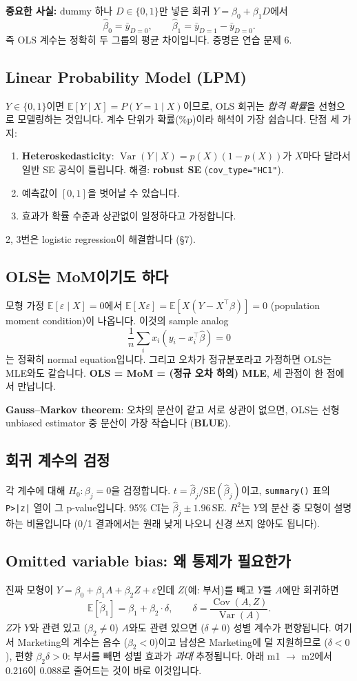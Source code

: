 \documentclass[11pt,a4paper]{article}
\newcommand{\E}{\mathbb{E}}
\newcommand{\Var}{\operatorname{Var}}
\newcommand{\Cov}{\operatorname{Cov}}
\newcommand{\term}[1]{\textbf{#1}}
\newcommand{\code}[1]{\texttt{#1}}
\begin{document}
\textbf{중요한 사실:} dummy 하나 $D\in\{0,1\}$만 넣은 회귀 $Y=\beta_0+\beta_1D$에서
\[
\hat\beta_0=\bar y_{D=0},\qquad \hat\beta_1=\bar y_{D=1}-\bar y_{D=0}.
\]
즉 OLS 계수는 정확히 두 그룹의 평균 차이입니다. 증명은 연습 문제 6.

\subsection{Linear Probability Model (LPM)}
$Y\in\{0,1\}$이면 $\E[Y\mid X]=P(Y=1\mid X)$이므로, OLS 회귀는 \emph{합격 확률}을 선형으로 모델링하는 것입니다. 계수 단위가 확률(\%p)이라 해석이 가장 쉽습니다. 단점 세 가지:
\begin{enumerate}
\item \term{Heteroskedasticity}: $\Var(Y\mid X)=p(X)(1-p(X))$가 $X$마다 달라서 일반 SE 공식이 틀립니다. 해결: \term{robust SE} (\code{cov\_type="HC1"}).
\item 예측값이 $[0,1]$을 벗어날 수 있습니다.
\item 효과가 확률 수준과 상관없이 일정하다고 가정합니다.
\end{enumerate}
2, 3번은 logistic regression이 해결합니다 (\S7).

\subsection{OLS는 MoM이기도 하다}
모형 가정 $\E[\varepsilon\mid X]=0$에서 $\E[X\varepsilon]=\E[X(Y-X^\top\beta)]=0$ (population moment condition)이 나옵니다. 이것의 sample analog
\[
\frac1n\sum_i x_i(y_i-x_i^\top\hat\beta)=0
\]
는 정확히 normal equation입니다. 그리고 오차가 정규분포라고 가정하면 OLS는 MLE와도 같습니다. \textbf{OLS = MoM = (정규 오차 하의) MLE}, 세 관점이 한 점에서 만납니다.

\term{Gauss–Markov theorem}: 오차의 분산이 같고 서로 상관이 없으면, OLS는 선형 unbiased estimator 중 분산이 가장 작습니다 (\term{BLUE}).

\subsection{회귀 계수의 검정}
각 계수에 대해 $H_0:\beta_j=0$을 검정합니다. $t=\hat\beta_j/\mathrm{SE}(\hat\beta_j)$이고, \code{summary()} 표의 \code{P>|z|} 열이 그 p-value입니다. 95\% CI는 $\hat\beta_j\pm1.96\,\mathrm{SE}$. \term{$R^2$}는 $Y$의 분산 중 모형이 설명하는 비율입니다 (0/1 결과에서는 원래 낮게 나오니 신경 쓰지 않아도 됩니다).

\subsection{Omitted variable bias: 왜 통제가 필요한가}
진짜 모형이 $Y=\beta_0+\beta_1A+\beta_2Z+\varepsilon$인데 $Z$(예: 부서)를 빼고 $Y$를 $A$에만 회귀하면
\[
\E[\tilde\beta_1]=\beta_1+\beta_2\cdot\delta,\qquad \delta=\frac{\Cov(A,Z)}{\Var(A)}.
\]
$Z$가 $Y$와 관련 있고 ($\beta_2\ne0$) $A$와도 관련 있으면 ($\delta\ne0$) 성별 계수가 편향됩니다. 여기서 Marketing의 계수는 음수 ($\beta_2<0$)이고 남성은 Marketing에 덜 지원하므로 ($\delta<0$), 편향 $\beta_2\delta>0$: 부서를 빼면 성별 효과가 \emph{과대} 추정됩니다. 아래 m1 $\to$ m2에서 0.216이 0.088로 줄어드는 것이 바로 이것입니다.
\end{document}
